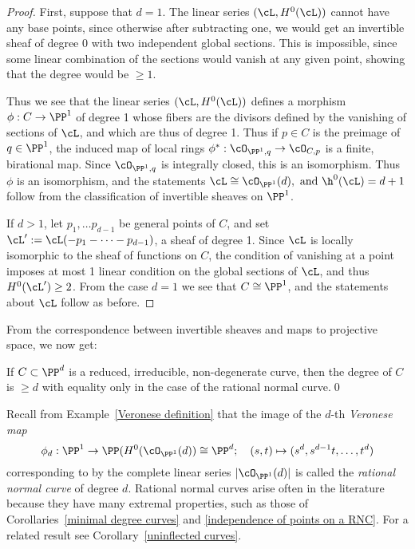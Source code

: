 \begin{proof}
First, suppose that $d=1$. The linear series $(\cL, H^0(\cL))$ cannot have any base points, since
otherwise after subtracting one, we would get an invertible sheaf of degree $0$ with two independent global sections. This is impossible, since some linear combination of the sections would vanish at any given point, showing that the degree would be
$\geq 1$.

Thus we see that the linear series $(\cL, H^0(\cL))$ defines a morphism $\phi: C\to \PP^1$ of degree 1 whose fibers are the divisors defined by
the vanishing of sections of $\cL$, and which are thus of degree 1. Thus if $p\in C$ is the preimage of $q\in \PP^1$, the induced map of local rings
$\phi^*:\cO_{\PP^1, q} \to \cO_{C, p}$ is a finite, birational map. Since $\cO_{\PP^1, q}$ is integrally closed, this is an isomorphism. Thus 
$\phi$ is an isomorphism, and the statements $\cL \cong \cO_{\PP^1}(d), \hbox{ and  } \h^0(\cL) = d+1$ follow from the classification of invertible sheaves on $\PP^1$. 

If $d>1$, let $p_1,\dots p_{d-1}$ be general points of $C$, and set $\cL':=\cL(-p_1-\cdots-p_{d-1})$, a sheaf of degree 1.
 Since $\cL$ is locally isomorphic to the sheaf of functions on $C$, the condition of vanishing at a point imposes at most 1 linear condition on 
the global sections of $\cL$, and thus $H^0(\cL') \geq 2$. From the case $d=1$ we see that $C\cong \PP^1$, and the statements
about $\cL$ follow as before.
 \end{proof}

From the correspondence between invertible sheaves and maps to projective space, we now get:
\begin{corollary}\label{minimal degree curves}
If $C\subset \PP^d$ is a reduced, irreducible, non-degenerate curve, then the degree of $C$ is $\geq d$ with equality only in the case
of the rational normal curve.\qed
\end{corollary}

Recall from Example~\ref{Veronese definition} that the image of the $d$-th \emph{Veronese map}  
$$
\phi_d: \PP^1 \to \PP(H^0(\cO_{\PP^1}(d)) \cong \PP^d; \quad (s,t) \mapsto (s^d, s^{d-1}t, \dots, t^d)
$$
corresponding to by the complete linear series $|\cO_{\PP^1}(d)|$ is called the \emph{rational normal curve} of degree $d$. Rational normal curves arise often in the literature because they have many extremal properties, such as those of Corollaries~\ref{minimal degree curves} and \ref{independence of points on a RNC}. For a related result see Corollary~\ref{uninflected curves}.

